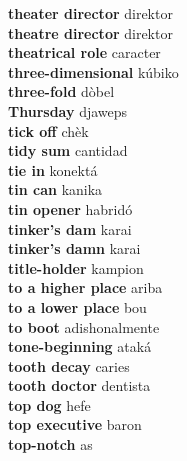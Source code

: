 \textbf{ theater director  } direktor \\
\textbf{ theatre director  } direktor \\
\textbf{ theatrical role  } caracter \\
\textbf{ three-dimensional  } kúbiko \\
\textbf{ three-fold  } dòbel \\
\textbf{ Thursday  } djaweps \\
\textbf{ tick off  } chèk \\
\textbf{ tidy sum  } cantidad \\
\textbf{ tie in  } konektá \\
\textbf{ tin can  } kanika \\
\textbf{ tin opener  } habridó \\
\textbf{ tinker’s dam  } karai \\
\textbf{ tinker’s damn  } karai \\
\textbf{ title-holder  } kampion \\
\textbf{ to a higher place  } ariba \\
\textbf{ to a lower place  } bou \\
\textbf{ to boot  } adishonalmente \\
\textbf{ tone-beginning  } ataká \\
\textbf{ tooth decay  } caries \\
\textbf{ tooth doctor  } dentista \\
\textbf{ top dog  } hefe \\
\textbf{ top executive  } baron \\
\textbf{ top-notch  } as \\
